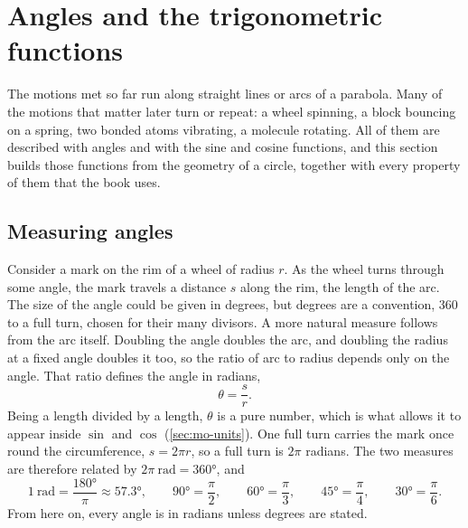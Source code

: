 \section{Angles and the trigonometric functions}
\label{sec:mo-trig}

The motions met so far run along straight lines or arcs of a parabola. Many
of the motions that matter later turn or repeat: a wheel spinning, a block
bouncing on a spring, two bonded atoms vibrating, a molecule rotating. All
of them are described with angles and with the sine and cosine functions,
and this section builds those functions from the geometry of a circle,
together with every property of them that the book uses.

\subsection*{Measuring angles}

Consider a mark on the rim of a wheel of radius $r$. As the wheel turns
through some angle, the mark travels a distance $s$ along the rim, the
length of the arc. The size of the angle could be given in degrees, but
degrees are a convention, 360 to a full turn, chosen for their many
divisors. A more natural measure follows from the arc itself. Doubling the
angle doubles the arc, and doubling the radius at a fixed angle doubles it
too, so the ratio of arc to radius depends only on the angle. That ratio
defines the angle in radians,
\begin{equation*}
   \theta = \frac{s}{r} .
\end{equation*}
Being a length divided by a length, $\theta$ is a pure number, which is
what allows it to appear inside $\sin$ and $\cos$ (\cref{sec:mo-units}).
One full turn carries the mark once round the circumference, $s = 2\pi r$,
so a full turn is $2\pi$ radians. The two measures are therefore related by
$2\pi\ \text{rad} = \ang{360}$, and
\begin{equation*}
   \SI{1}{\radian} = \frac{\ang{180}}{\pi} \approx \ang{57.3}, \qquad
   \ang{90} = \frac{\pi}{2}, \qquad \ang{60} = \frac{\pi}{3}, \qquad
   \ang{45} = \frac{\pi}{4}, \qquad \ang{30} = \frac{\pi}{6} .
\end{equation*}
From here on, every angle is in radians unless degrees are stated.

